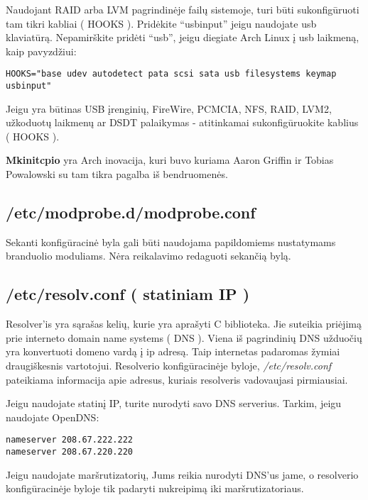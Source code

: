   Naudojant RAID arba LVM pagrindinėje failų sistemoje, turi būti
  sukonfigūruoti tam tikri kabliai ( HOOKS ). Pridėkite ``usbinput''
  jeigu naudojate usb klaviatūrą. Nepamirškite pridėti ``usb'', jeigu
  diegiate Arch Linux į usb laikmeną, kaip pavyzdžiui:

  \begin{verbatim}
HOOKS="base udev autodetect pata scsi sata usb filesystems keymap usbinput"
  \end{verbatim}

  Jeigu yra būtinas USB įrenginių, FireWire, PCMCIA, NFS, RAID, LVM2,
  užkoduotų laikmenų ar DSDT palaikymas - atitinkamai sukonfigūruokite
  kablius ( HOOKS ).

  \textbf{Mkinitcpio} yra Arch inovacija, kuri buvo kuriama Aaron
  Griffin ir Tobias Powalowski su tam tikra pagalba iš bendruomenės. 

\subsection{/etc/modprobe.d/modprobe.conf}

  Sekanti konfigūracinė byla gali būti naudojama papildomiems
  nustatymams branduolio moduliams. Nėra reikalavimo redaguoti
  sekančią bylą.

\subsection{/etc/resolv.conf ( statiniam IP )}

  Resolver'is yra sąrašas kelių, kurie yra aprašyti C biblioteka. Jie
  suteikia priėjimą prie interneto domain name systems ( DNS ). Viena
  iš pagrindinių DNS užduočių yra konvertuoti domeno vardą į ip
  adresą. Taip internetas padaromas žymiai draugiškesnis
  vartotojui. Resolverio konfigūracinėje byloje,
  \textsl{/etc/resolv.conf} pateikiama informacija apie adresus,
  kuriais resolveris vadovaujasi pirmiausiai.

  Jeigu naudojate statinį IP, turite nurodyti savo DNS
  serverius. Tarkim, jeigu naudojate OpenDNS:

  \begin{verbatim}
nameserver 208.67.222.222
nameserver 208.67.220.220
  \end{verbatim}

  Jeigu naudojate maršrutizatorių, Jums reikia nurodyti DNS'us jame, o
  resolverio konfigūracinėje byloje tik padaryti nukreipimą iki
  maršrutizatoriaus.

